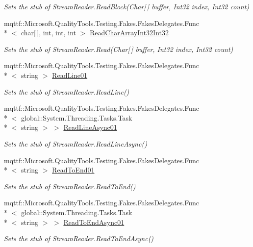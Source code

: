 \begin{DoxyCompactItemize}
\begin{DoxyCompactList}\small\item\em Sets the stub of Stream\-Reader.\-Read\-Block(\-Char\mbox{[}$\,$\mbox{]} buffer, Int32 index, Int32 count)\end{DoxyCompactList}\item 
mqttf\-::\-Microsoft.\-Quality\-Tools.\-Testing.\-Fakes.\-Fakes\-Delegates.\-Func\\*
$<$ char\mbox{[}$\,$\mbox{]}, int, int, int $>$ \hyperlink{class_system_1_1_i_o_1_1_fakes_1_1_stub_stream_reader_abdabf0cc7d34c14489731df4bf3bc495}{Read\-Char\-Array\-Int32\-Int32}
\begin{DoxyCompactList}\small\item\em Sets the stub of Stream\-Reader.\-Read(\-Char\mbox{[}$\,$\mbox{]} buffer, Int32 index, Int32 count)\end{DoxyCompactList}\item 
mqttf\-::\-Microsoft.\-Quality\-Tools.\-Testing.\-Fakes.\-Fakes\-Delegates.\-Func\\*
$<$ string $>$ \hyperlink{class_system_1_1_i_o_1_1_fakes_1_1_stub_stream_reader_a4878df0d173b5e789edeb1cf64c394a9}{Read\-Line01}
\begin{DoxyCompactList}\small\item\em Sets the stub of Stream\-Reader.\-Read\-Line()\end{DoxyCompactList}\item 
mqttf\-::\-Microsoft.\-Quality\-Tools.\-Testing.\-Fakes.\-Fakes\-Delegates.\-Func\\*
$<$ global\-::\-System.\-Threading.\-Tasks.\-Task\\*
$<$ string $>$ $>$ \hyperlink{class_system_1_1_i_o_1_1_fakes_1_1_stub_stream_reader_a8bcea0f41583305f24da96482b9a3a06}{Read\-Line\-Async01}
\begin{DoxyCompactList}\small\item\em Sets the stub of Stream\-Reader.\-Read\-Line\-Async()\end{DoxyCompactList}\item 
mqttf\-::\-Microsoft.\-Quality\-Tools.\-Testing.\-Fakes.\-Fakes\-Delegates.\-Func\\*
$<$ string $>$ \hyperlink{class_system_1_1_i_o_1_1_fakes_1_1_stub_stream_reader_aaea3a193e6d626255ecf1d45bcc593ed}{Read\-To\-End01}
\begin{DoxyCompactList}\small\item\em Sets the stub of Stream\-Reader.\-Read\-To\-End()\end{DoxyCompactList}\item 
mqttf\-::\-Microsoft.\-Quality\-Tools.\-Testing.\-Fakes.\-Fakes\-Delegates.\-Func\\*
$<$ global\-::\-System.\-Threading.\-Tasks.\-Task\\*
$<$ string $>$ $>$ \hyperlink{class_system_1_1_i_o_1_1_fakes_1_1_stub_stream_reader_a0ac1a9e7b354daefa317243ca063721a}{Read\-To\-End\-Async01}
\begin{DoxyCompactList}\small\item\em Sets the stub of Stream\-Reader.\-Read\-To\-End\-Async()\end{DoxyCompactList}\end{DoxyCompactItemize}
